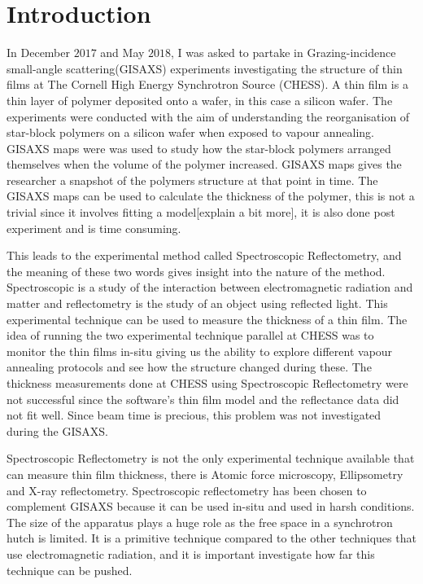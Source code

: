 \documentclass[MasterThesisMain.tex]{subfiles}
\begin{document}
	\chapter{Introduction}
	
In December $2017$ and May $2018$, I was asked to partake in Grazing-incidence small-angle scattering(GISAXS) experiments investigating the structure of thin films at The Cornell High Energy Synchrotron Source (CHESS). A thin film is a thin layer of polymer deposited onto a wafer, in this case a silicon wafer. The experiments were conducted with the aim of understanding the reorganisation of star-block polymers on a silicon wafer when exposed to vapour annealing. GISAXS maps were was used to study how the star-block polymers arranged themselves when the volume of the polymer increased. GISAXS maps gives the researcher a snapshot of the polymers structure at that point in time. The GISAXS maps can be used to calculate the thickness of the polymer, this is not a trivial since it involves fitting a model[explain a bit more], it is also done post experiment and is time consuming. 

This leads to the experimental method called Spectroscopic Reflectometry, and the meaning of these two words gives insight into the nature of the method. Spectroscopic is a study of the interaction between electromagnetic radiation and matter \cite{levinechemistry} and reflectometry is the study of an object using reflected light. This experimental technique can be used to measure the thickness of a thin film. The idea of running the two experimental technique parallel at CHESS was to monitor the thin films in-situ giving us the ability to explore different vapour annealing protocols and see how the structure changed during these. The thickness measurements done at CHESS using Spectroscopic Reflectometry were not successful since the software's thin film model and the reflectance data did not fit well. Since beam time is precious, this problem was not investigated during the GISAXS.

Spectroscopic Reflectometry is not the only experimental technique available that can measure thin film thickness, there is Atomic force microscopy, Ellipsometry and X-ray reflectometry. Spectroscopic reflectometry has been chosen to complement GISAXS because it can be used in-situ and used in harsh conditions. The size of the apparatus plays a huge role as the free space in a synchrotron hutch is limited. It is a primitive technique compared to the other techniques that use electromagnetic radiation, and it is important investigate how far this technique can be pushed.
\end{document}
